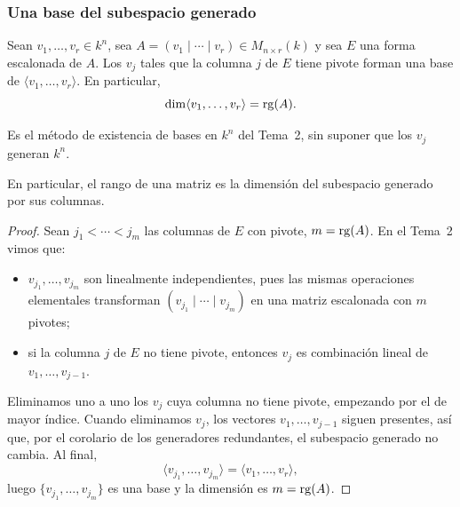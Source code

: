 \begin{frame}[allowframebreaks]
    \frametitle{Una base del subespacio generado}

    \begin{proposition}
        Sean $v_1,\ldots,v_r\in k^n$, sea
        $A=(v_1\mid\cdots\mid v_r)\in M_{n\times r}(k)$ y sea $E$ una forma
        escalonada de $A$. Los $v_j$ tales que la columna $j$ de $E$ tiene
        pivote forman una base de $\langle v_1,\ldots,v_r\rangle$. En
        particular,
        \[
            \dim\langle v_1,\ldots,v_r\rangle=\operatorname{rg}(A).
        \]
    \end{proposition}

    \medskip

    Es el método de existencia de bases en $k^n$ del Tema~2, sin suponer
    que los $v_j$ generan $k^n$.

    \medskip

    En particular, el rango de una matriz es la \alert{dimensión} del
    subespacio generado por sus columnas.

    \framebreak

    \begin{proof}
        Sean $j_1<\cdots<j_m$ las columnas de $E$ con pivote, $m=\operatorname{rg}(A)$.
        En el Tema~2 vimos que:
        \begin{itemize}
            \item $v_{j_1},\ldots,v_{j_m}$ son linealmente independientes,
            pues las mismas operaciones elementales transforman
            $(v_{j_1}\mid\cdots\mid v_{j_m})$ en una matriz escalonada con
            $m$ pivotes;
            \item si la columna $j$ de $E$ no tiene pivote, entonces $v_j$ es
            combinación lineal de $v_1,\ldots,v_{j-1}$.
        \end{itemize}

        Eliminamos uno a uno los $v_j$ cuya columna no tiene pivote,
        empezando por el de mayor índice. Cuando eliminamos $v_j$, los
        vectores $v_1,\ldots,v_{j-1}$ siguen presentes, así que, por el
        corolario de los generadores redundantes, el subespacio generado
        no cambia. Al final,
        \[
            \langle v_{j_1},\ldots,v_{j_m}\rangle
            =\langle v_1,\ldots,v_r\rangle,
        \]
        luego $\{v_{j_1},\ldots,v_{j_m}\}$ es una base y la dimensión es
        $m=\operatorname{rg}(A)$.
    \end{proof}
\end{frame}

